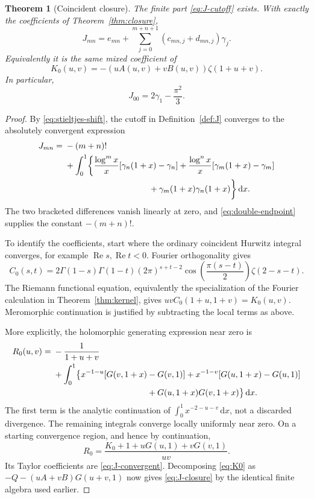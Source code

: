 \documentclass[11pt]{article}
\numberwithin{equation}{section}
\newtheorem{theorem}{Theorem}[section]
\theoremstyle{definition}
\theoremstyle{remark}
\DeclareMathOperator{\Rea}{Re}
\newcommand{\dd}{\,\mathrm d}
\begin{document}
\begin{theorem}[Coincident closure]
\label{thm:coincident}
The finite part \eqref{eq:J-cutoff} exists. With exactly the coefficients
of Theorem~\ref{thm:closure},
\begin{equation}
 J_{mn}=e_{mn}+\sum_{j=0}^{m+n+1}(c_{mn,j}+d_{mn,j})\gamma_j.
 \label{eq:J-closure}
\end{equation}
Equivalently it is the same mixed coefficient of
\begin{equation}
 K_0(u,v)=-(uA(u,v)+vB(u,v))\zeta(1+u+v).
 \label{eq:K0}
\end{equation}
In particular,
\begin{equation}
 J_{00}=2\gamma_1-\frac{\pi^2}{3}.
 \label{eq:J00}
\end{equation}
\end{theorem}
\begin{proof}
By \eqref{eq:stieltjes-shift}, the cutoff in Definition~\ref{def:J}
converges to the absolutely convergent expression
\begin{align}
 J_{mn}={}&-(m+n)!\notag\\
 &+\int_0^1\biggl\{
 \frac{\log^m x}{x}[\gamma_n(1+x)-\gamma_n]
 +\frac{\log^n x}{x}[\gamma_m(1+x)-\gamma_m]\notag\\
 &\hspace{35mm}+\gamma_m(1+x)\gamma_n(1+x)\biggr\}\dd x.
 \label{eq:J-convergent}
\end{align}
The two bracketed differences vanish linearly at zero, and
\eqref{eq:double-endpoint} supplies the constant $-(m+n)!$.

To identify the coefficients, start where the ordinary coincident
Hurwitz integral converges, for example $\Rea s,\Rea t<0$.
Fourier orthogonality gives
\[
 C_0(s,t)=2\Gamma(1-s)\Gamma(1-t)(2\pi)^{s+t-2}
       \cos\!\left(\frac{\pi(s-t)}2\right)\zeta(2-s-t).
\]
The Riemann functional equation, equivalently the specialization of the
Fourier calculation in Theorem~\ref{thm:kernel}, gives
$uvC_0(1+u,1+v)=K_0(u,v)$. Meromorphic continuation is justified by
subtracting the local terms as above.

More explicitly, the holomorphic generating expression near zero is
\begin{align*}
 R_0(u,v)={}&-\frac1{1+u+v}\\
 &+\int_0^1\bigl\{
 x^{-1-u}[G(v,1+x)-G(v,1)]
 +x^{-1-v}[G(u,1+x)-G(u,1)]\\
 &\hspace{39mm}+G(u,1+x)G(v,1+x)\bigr\}\dd x.
\end{align*}
The first term is the analytic continuation of
$\int_0^1x^{-2-u-v}\dd x$, not a discarded divergence. The remaining
integrals converge locally uniformly near zero. On a starting convergence
region, and hence by continuation,
\[
 R_0=\frac{K_0+1+uG(u,1)+vG(v,1)}{uv}.
\]
Its Taylor coefficients are \eqref{eq:J-convergent}. Decomposing
\eqref{eq:K0} as $-Q-(uA+vB)G(u+v,1)$ now gives
\eqref{eq:J-closure} by the identical finite algebra used earlier.
\end{proof}
\end{document}

